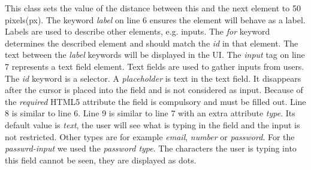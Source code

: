 This class sets the value of the distance between this and the next element to 50 pixels(px). The keyword \textit{label} on line 6 ensures the element will behave as a label. Labels are used to describe other elements, e.g. inputs. The \textit{for} keyword determines the described element and should match the \textit{id} in that element. The text between the \textit{label} keywords will be displayed in the UI. The \textit{input} tag on line 7 represents a text field element. Text fields are used to gather inputs from users. The \textit{id} keyword is a selector. A \textit{placeholder} is text in the text field. It disappears after the cursor is placed into the field and is not considered as input. Because of the \textit{required} HTML5 attribute the field is compulsory and must be filled out. Line 8 is similar to line 6. Line 9 is similar to line 7 with an extra attribute \textit{type}. Its default value is \textit{text}, the user will see what is typing in the field and the input is not restricted. Other types are for example \textit{email}, \textit{number} or \textit{password}. For the \textit{passwrd-input} we used the \textit{password type}. The characters the user is typing into this field cannot be seen, they are displayed as dots.

